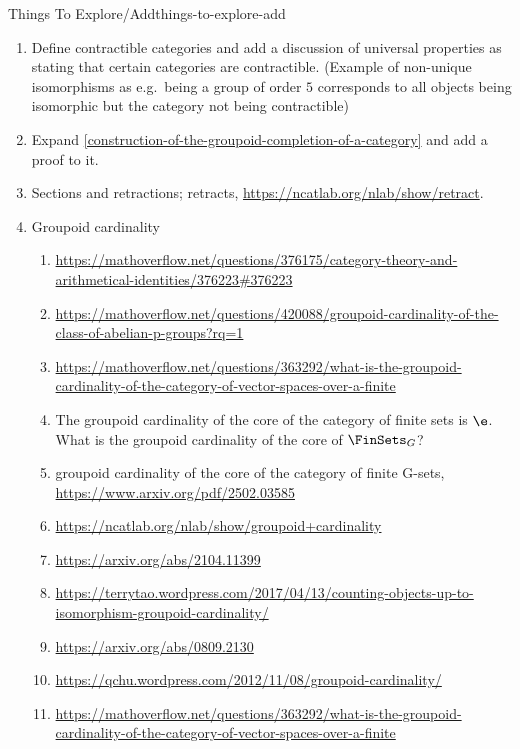 \begin{remark}{Things To Explore/Add}{things-to-explore-add}
\begin{enumerate}
\begin{enumerate}
                \item Crossed Simplicial Group Categorical Nerves, \url{https://arxiv.org/abs/1603.08768}
            \end{enumerate}
        \item Define contractible categories and add a discussion of universal properties as stating that certain categories are contractible. (Example of non-unique isomorphisms as e.g.\ being a group of order $5$ corresponds to all objects being isomorphic but the category not being contractible)
        \item Expand \cref{construction-of-the-groupoid-completion-of-a-category} and add a proof to it.
        \item Sections and retractions; retracts, \url{https://ncatlab.org/nlab/show/retract}.
        \item Groupoid cardinality
            \begin{enumerate}
                \item \url{https://mathoverflow.net/questions/376175/category-theory-and-arithmetical-identities/376223#376223}
                \item \url{https://mathoverflow.net/questions/420088/groupoid-cardinality-of-the-class-of-abelian-p-groups?rq=1}
                \item \url{https://mathoverflow.net/questions/363292/what-is-the-groupoid-cardinality-of-the-category-of-vector-spaces-over-a-finite}
                \item The groupoid cardinality of the core of the category of finite sets is $\e$. What is the groupoid cardinality of the core of $\FinSets_{G}$?
                \item groupoid cardinality of the core of the category of finite G-sets, \url{https://www.arxiv.org/pdf/2502.03585}
                \item \url{https://ncatlab.org/nlab/show/groupoid+cardinality}
                \item \url{https://arxiv.org/abs/2104.11399}
                \item \url{https://terrytao.wordpress.com/2017/04/13/counting-objects-up-to-isomorphism-groupoid-cardinality/}
                \item \url{https://arxiv.org/abs/0809.2130}
                \item \url{https://qchu.wordpress.com/2012/11/08/groupoid-cardinality/}
                \item \url{https://mathoverflow.net/questions/363292/what-is-the-groupoid-cardinality-of-the-category-of-vector-spaces-over-a-finite}

\end{enumerate}
\end{enumerate}
\end{remark}
